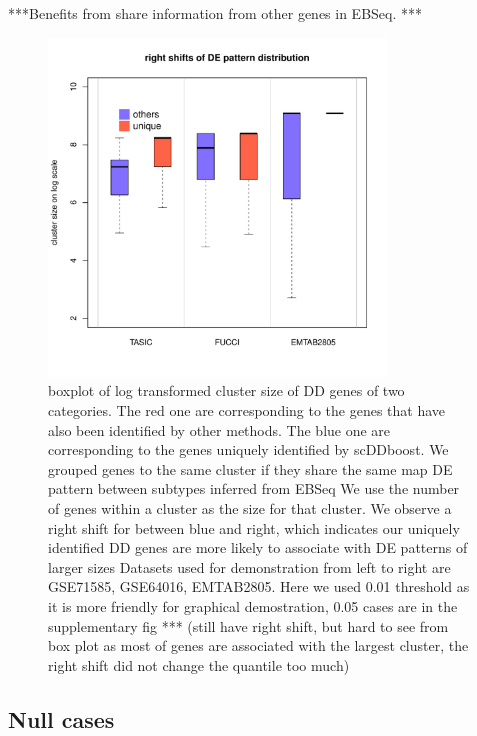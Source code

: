 \documentclass[aoas,preprint]{imsart}
\begin{document}
***Benefits from share information from other genes in EBSeq. ***
\begin{figure}[H]
\includegraphics[width = 0.8\textwidth]{Figs/clussz.pdf}
 \caption{  boxplot of log transformed cluster size of DD genes of two categories. 
 The red one are corresponding to the genes that have also been identified by other methods.
 The blue one are corresponding to the genes uniquely identified by scDDboost. 
 We grouped genes to the same cluster if they share the same  map DE pattern between subtypes inferred from EBSeq
 We use the number of genes within a cluster as the size for that cluster. 
 We observe a right shift for between blue and right, which indicates our uniquely identified DD genes are more likely to associate with DE patterns of larger sizes
 Datasets used for demonstration from left to right are GSE71585, GSE64016, EMTAB2805. 
 Here we used 0.01 threshold as it is more friendly for graphical demostration, 0.05 cases are in the supplementary fig *** (still have right shift, but hard to see from box plot as most of genes are associated with the largest cluster, the right shift did not change the quantile too much) }
  \label{fig:7}
\end{figure}




\subsection{Null cases}
\end{document}
